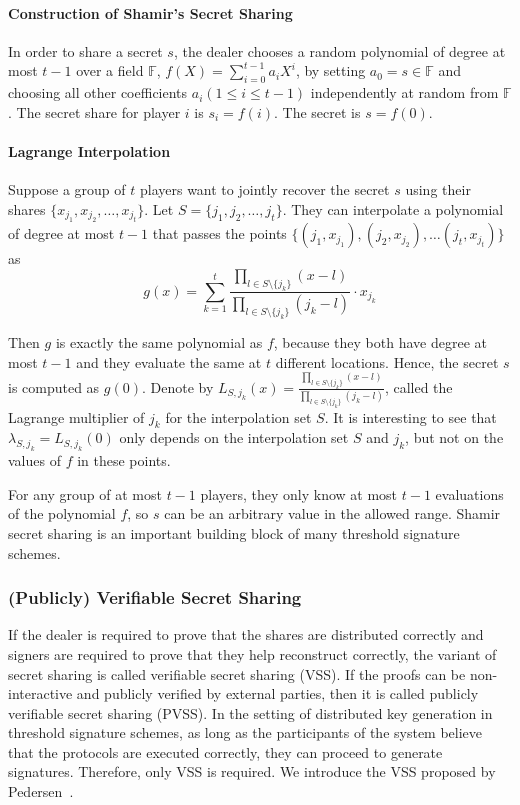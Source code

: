 \paragraph{Construction of Shamir's Secret Sharing} In order to share a secret $s$, the dealer chooses a random polynomial of degree at most $t-1$ over a field $\mathbb{F}$, $f(X)=\sum_{i=0}^{t-1} a_i X^i$, by setting $a_0=s\in \mathbb{F}$ and choosing all other coefficients $a_i(1\le i\le t-1)$ independently at random from $\mathbb{F}$. The secret share for player $i$ is $s_i = f(i)$. The secret is $s=f(0)$. 

\paragraph{Lagrange Interpolation} Suppose a group of $t$ players want to jointly recover the secret $s$ using their shares $\{x_{j_1}, x_{j_2},\dots, x_{j_t}\}$. Let $S = \{j_1, j_2, \dots, j_t\}$. They can interpolate a polynomial of degree at most $t-1$ that passes the points $\{(j_1, x_{j_1}), (j_2, x_{j_2}), \dots (j_t, x_{j_t})\}$ as
\begin{equation*} 
    g(x) = \sum_{k=1}^{t}\frac{\prod_{l \in S\setminus \{j_k\} } (x - l)}{\prod_{l \in S\setminus \{j_k\} } (j_k - l)}\cdot x_{j_k}   
\end{equation*}

\par Then $g$ is exactly the same polynomial as $f$, because they both have degree at most $t-1$ and they evaluate the same at $t$ different locations. Hence, the secret $s$ is computed as $g(0)$. Denote by $L_{S, j_k}(x) = \frac{\prod_{l \in S\setminus \{j_k\} } (x - l)}{\prod_{l \in S\setminus \{j_k\} } (j_k - l)}$, called the Lagrange multiplier of $j_k$ for the interpolation set $S$. It is interesting to see that $\lambda_{S, j_k} = L_{S, j_k}(0)$ only depends on the interpolation set $S$ and $j_k$, but not on the values of $f$ in these points.  

For any group of at most $t-1$ players, they only know at most $t-1$ evaluations of the polynomial $f$, so $s$ can be an arbitrary value in the allowed range. Shamir secret sharing is an important building block of many threshold signature schemes. 

\subsubsection{(Publicly) Verifiable Secret Sharing} 
If the dealer is required to prove that the shares are distributed correctly and signers are required to prove that they help reconstruct correctly, the variant of secret sharing is called verifiable secret sharing (VSS). If the proofs can be non-interactive and publicly verified by external parties, then it is called publicly verifiable secret sharing (PVSS). In the setting of distributed key generation in threshold signature schemes, as long as the participants of the system believe that the protocols are executed correctly, they can proceed to generate signatures. Therefore, only VSS is required. We introduce the VSS proposed by Pedersen~\cite{DBLP:conf/crypto/Pedersen91}. 

